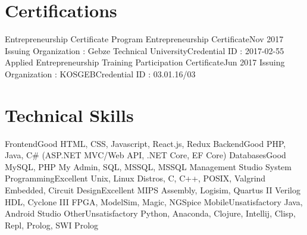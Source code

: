 \documentclass{main} %
\begin{document}
\section{Certifications}
    \resumeSubHeadingListStart
        \resumeSubheading
            {Entrepreneurship Certificate Program Entrepreneurship Certificate}{Nov 2017}
            {Issuing Organization : Gebze Technical University}{Credential ID : 2017-02-55}
        \resumeSubheading
            {Applied Entrepreneurship Training Participation Certificate}{Jun 2017}
            {Issuing Organization : KOSGEB}{Credential ID : 03.01.16/03}
    \resumeSubHeadingListEnd

\section{Technical Skills}
    \resumeSubHeadingListStart
        \resumeSubheading
            {Frontend}{Good} %
            {HTML, CSS, Javascript, React.js, Redux}{}
        \resumeSubheading
            {Backend}{Good} %
            {PHP, Java, C\# (ASP.NET MVC/Web API, .NET Core, EF Core)}{}
        \resumeSubheading
            {Databases}{Good} %
            {MySQL, PHP My Admin, SQL, MSSQL, MSSQL Management Studio}{}
        \resumeSubheading
            {System Programming}{Excellent}
            {Unix, Linux Distros, C, C++, POSIX, Valgrind}{}
        \resumeSubheading
            {Embedded, Circuit Design}{Excellent}
            {MIPS Assembly, Logisim, Quartus II Verilog HDL, Cyclone III FPGA, ModelSim, Magic, NGSpice}{}
        \resumeSubheading
            {Mobile}{Unsatisfactory}
            {Java, Android Studio}{}
        \resumeSubheading
            {Other}{Unsatisfactory} %
            {Python, Anaconda, Clojure, Intellij, Clisp, Repl, Prolog, SWI Prolog}{}
    \resumeSubHeadingListEnd
\end{document}
